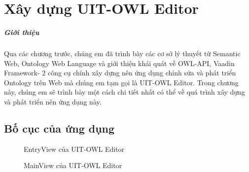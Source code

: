 \chapter{Xây dựng UIT-OWL Editor}
\paragraph{Giới thiệu} Qua các chương trước, chúng em đã trình bày các cơ sở lý thuyết từ Semantic Web, Ontology Web Language và giới thiệu khái quát về OWL-API, Vaadin Framework- 2 công cụ chính xây dựng nên ứng dụng chỉnh sửa và phát triển Ontology trên Web mà chúng em tạm gọi là UIT-OWL Editor. Trong chương này, chúng em sẽ trình bày một cách chi tiết nhất có thể về quá trình xây dựng và phát triển nên ứng dụng này.
\section{Bố cục của ứng dụng}
\begin{figure}[h!]
	\centering
	\caption{EntryView của UIT-OWL Editor\label{overflow}}
\end{figure}
\begin{figure}[h!]
	\centering
	\caption{MainView của UIT-OWL Editor\label{overflow}}
\end{figure}
%
